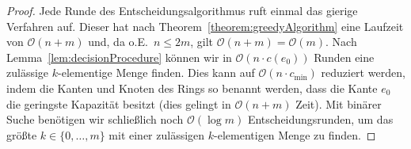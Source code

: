 \begin{proof}
    Jede Runde des Entscheidungsalgorithmus ruft einmal das gierige Verfahren auf.
    Dieser hat nach Theorem~\ref{theorem:greedyAlgorithm} eine Laufzeit von $\mathcal O(n+m)$ und, da o.E.\
    $n \leq 2m$, gilt $\mathcal O(n+m) = \mathcal O(m)$.
    Nach Lemma~\ref{lem:decisionProcedure} können wir in $\mathcal O(n \cdot c(e_0))$ Runden eine zulässige $k$-elementige Menge finden.
    Dies kann auf $\mathcal O(n \cdot c_{\min})$ reduziert werden, indem die Kanten und Knoten des Rings so benannt werden, dass
    die Kante $e_0$ die geringste Kapazität besitzt (dies gelingt in $\mathcal O(n+m)$ Zeit).
    Mit binärer Suche benötigen wir schließlich noch $\mathcal O(\log m)$ Entscheidungsrunden, um das größte $k \in \{0, \dots, m\}$
    mit einer zulässigen $k$-elementigen Menge zu finden.
\end{proof}













